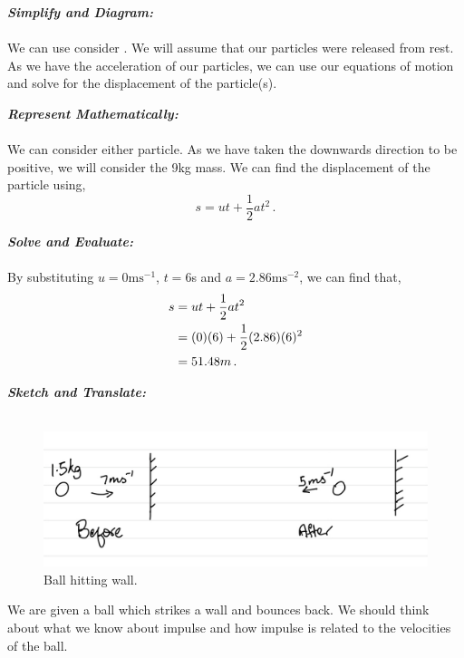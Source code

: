 \begin{subquestions}
\begin{subsubquestions}

\subsubquestion

\textbf{\textit{Simplify and Diagram:}} \\ \\
We can use consider . We will assume that our particles were released from rest. As we have the acceleration of our particles, we can use our equations of motion and solve for the displacement of the particle(s).




\textbf{\textit{Represent Mathematically:}} \\ \\
We can consider either particle. As we have taken the downwards direction to be positive, we will consider the 9kg mass. We can find the displacement of the particle using,
\begin{equation}
	s=ut+\frac{1}{2}at^2 \,.
\end{equation}




\textbf{\textit{Solve and Evaluate:}} \\ \\
By substituting $u=0\text{ms}^{-1}$, $t=6$s and $a=2.86\text{ms}^{-2}$, we can find that,
\begin{align}
	s & = ut+\frac{1}{2}at^2 \nonumber \\
	  & = (0)(6) + \frac{1}{2}(2.86)(6)^2 \nonumber \\
	  & = 51.48m \,.
\end{align}

\end{subsubquestions}


\subquestion

\textbf{\textit{Sketch and Translate:}} \\ \\
\begin{figure}[H]
	\begin{center}
		\includegraphics[scale=0.25]{../2013/figures/2013q6-2}
		\caption{\label{2013:q6:Sketch2} Ball hitting wall.}
	\end{center}
\end{figure}	
We are given a ball which strikes a wall and bounces back. We should think about what we know about impulse and how impulse is related to the velocities of the ball.





\end{subquestions}
